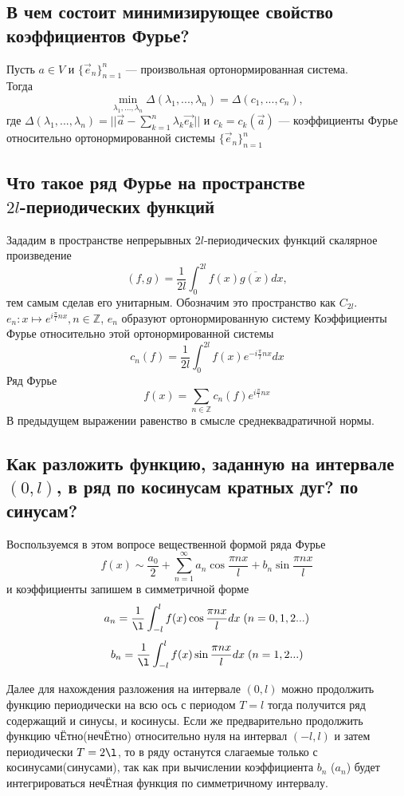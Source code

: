 \documentclass{article}
\begin{document}
\subsection{В чем состоит минимизирующее свойство коэффициентов Фурье?}
Пусть $a \in V$ и $\{\vec{e}_n\}_{n=1}^{n}$ --- произвольная ортонормированная система.\\
Тогда \[\min_{\lambda_1,...,\lambda_n} \Delta (\lambda_1,...,\lambda_n) = \Delta(c_1,...,c_n),\]
где $\Delta (\lambda_1,...,\lambda_n) = ||\vec{a}-\sum_{k=1}^n\lambda_k\vec{e_k}||$ и 
$c_k = c_k(\vec{a})$ --- коэффициенты Фурье относительно ортонормированной системы $\{\vec{e}_n\}_{n=1}^{n}$



\subsection{Что такое ряд Фурье на пространстве\\$2l$-периодических функций}
Зададим в пространстве непрерывных $2l$-периодических функций скалярное произведение
\[(f, g) = \frac{1}{2l}\int_0^{2l}f(x)\overline{g(x)}dx,\]
тем самым сделав его унитарным. Обозначим это пространство как $C_{2l}$.\\

$e_n: x \mapsto e^{i\frac{\pi}{l}nx}, n \in \mathbb{Z}$, $e_n$ образуют ортонормированную систему
Коэффициенты Фурье относительно этой ортонормированной системы
\[c_n(f) = \frac{1}{2l} \int_0^{2l}f(x)e^{-i\frac{\pi}{l}nx}dx\]
Ряд Фурье 
\[f(x) = \sum_{n \in \mathbb{Z}} c_n(f)e^{i\frac{\pi}{l}nx}\]
В предыдущем выражении равенство в смысле среднеквадратичной нормы.



\subsection{Как разложить функцию, заданную на интервале $(0, l)$, в ряд по косинусам кратных дуг? по синусам?}
Воспользуемся в этом вопросе вещественной формой ряда Фурье
\[f(x) \sim \frac{a_0}{2}+\sum_{n=1}^{\infty}a_n \cos \frac{\pi nx}{l} +b_n \sin \frac{\pi nx}{l}\]
и коэффициенты запишем в симметричной форме
\[a_n = \frac{1}{\l}\int_{-l}^l f(x)\cos \frac{\pi nx}{l} dx\; (n = 0, 1, 2 ...)\]
\[b_n = \frac{1}{\l}\int_{-l}^l f(x)\sin \frac{\pi nx}{l} dx\; (n = 1, 2 ...)\]

Далее для нахождения разложения на интервале $(0, l)$ можно продолжить функцию периодически на всю ось с периодом $T = l$ тогда получится ряд содержащий и синусы, и косинусы. Если же предварительно продолжить функцию ч{\footnotesize Ё}тно(неч{\footnotesize Ё}тно) относительно нуля на интервал $ (-l, l) $ и затем периодически $T = 2\l$, то в ряду останутся слагаемые только с косинусами(синусами), так как при вычислении коэффициента $ b_n $ ($a_n$) будет интегрироваться неч{\footnotesize Ё}тная функция по симметричному интервалу.
\end{document}
